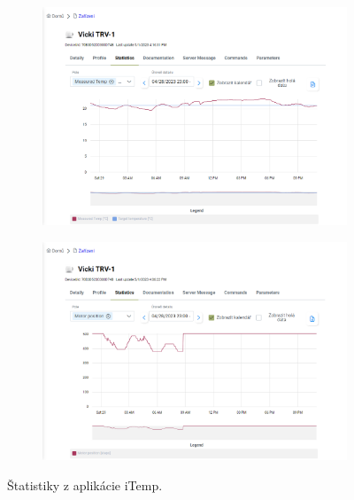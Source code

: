\begin{figure}[H]
    \centering
    \begin{subfigure}[b]{\textwidth}
        \includegraphics[width=\textwidth]{obrazky-figures/iTempStatisticTemp.png}
    \end{subfigure}
    \begin{subfigure}[b]{\textwidth}
        \includegraphics[width=\textwidth]{obrazky-figures/iTempStatisticPosition.png}
    \end{subfigure}
    \caption{Štatistiky z aplikácie iTemp.}
    \label{fig:test_itempStat}
\end{figure}

